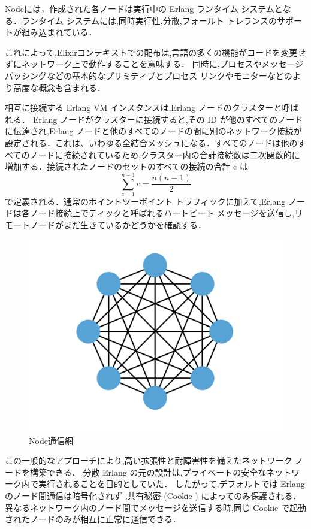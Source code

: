 \documentclass[a4paper]{jreport}	%
\begin{document}
Nodeには，作成された各ノードは実行中の Erlang ランタイム システムとなる．ランタイム システムには,同時実行性,分散,フォールト トレランスのサポートが組み込まれている．

これによって,Elixirコンテキストでの配布は,言語の多くの機能がコードを変更せずにネットワーク上で動作することを意味する． 同時に,プロセスやメッセージ パッシングなどの基本的なプリミティブとプロセス リンクやモニターなどのより高度な概念も含まれる．

相互に接続する Erlang VM インスタンスは,Erlang ノードのクラスターと呼ばれる． Erlang ノードがクラスターに接続すると,その ID が他のすべてのノードに伝達され,Erlang ノードと他のすべてのノードの間に別のネットワーク接続が設定される．これは、いわゆる全結合メッシュになる．すべてのノードは他のすべてのノードに接続されているため,クラスター内の合計接続数は二次関数的に増加する．接続されたノードのセットのすべての接続の合計 c は \[ \sum_{c=1}^{n-1}c = \frac{n(n-1)}2\]で定義される．通常のポイントツーポイント トラフィックに加えて,Erlang ノードは各ノード接続上でティックと呼ばれるハートビート メッセージを送信し,リモートノードがまだ生きているかどうかを確認する．
\begin{figure}[H]
\vspace{4cm}
\begin{center}
\hspace{-5cm}
\includegraphics[scale=0.2]{ja/f1.png}
\end{center}
\caption{Node通信網}
\end{figure}

この一般的なアプローチにより,高い拡張性と耐障害性を備えたネットワーク ノードを構築できる． 分散 Erlang の元の設計は,プライベートの安全なネットワーク内で実行されることを目的としていた． したがって,デフォルトでは Erlang のノード間通信は暗号化されず \cite{I},共有秘密 (Cookie ) によってのみ保護される．異なるネットワーク内のノード間でメッセージを送信する時,同じ Cookie で起動されたノードのみが相互に正常に通信できる．
\end{document}
